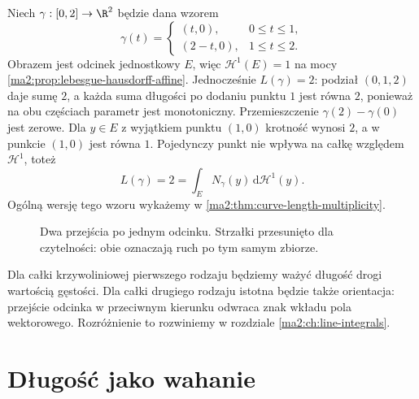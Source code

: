 \begin{przyklad}
\label{ma2:ex:curve-out-and-back}
Niech $\gamma:[0,2]\to\R^2$ będzie dana wzorem
\[
 \gamma(t)=
 \begin{cases}
 (t,0),&0\le t\le1,\\
 (2-t,0),&1\le t\le2.
 \end{cases}
\]
Obrazem jest odcinek jednostkowy $E$,
więc $\mathcal H^1(E)=1$ na mocy
\ref{ma2:prop:lebesgue-hausdorff-affine}.
Jednocześnie $L(\gamma)=2$:
podział $(0,1,2)$ daje sumę $2$,
a każda suma długości po dodaniu
punktu $1$ jest równa $2$, ponieważ
na obu częściach parametr jest monotoniczny.
Przemieszczenie $\gamma(2)-\gamma(0)$
jest zerowe. Dla $y\in E$ z wyjątkiem
punktu $(1,0)$ krotność wynosi $2$,
a w punkcie $(1,0)$ jest równa $1$.
Pojedynczy punkt nie wpływa na całkę
względem $\mathcal H^1$, toteż
\[
 L(\gamma)=2
 =\int_E N_\gamma(y)\,\mathrm d\mathcal H^1(y).
\]
Ogólną wersję tego wzoru wykażemy
w \ref{ma2:thm:curve-length-multiplicity}.
\end{przyklad}

\begin{figure}[htbp]
\centering
{}
\caption{Dwa przejścia po jednym odcinku.
Strzałki przesunięto dla czytelności:
obie oznaczają ruch po tym samym zbiorze.}
\label{ma2:fig:curve-out-and-back}
\end{figure}

Dla całki krzywoliniowej pierwszego
rodzaju będziemy ważyć długość drogi
wartością gęstości. Dla całki drugiego
rodzaju istotna będzie także orientacja:
przejście odcinka w przeciwnym kierunku
odwraca znak wkładu pola wektorowego.
Rozróżnienie to rozwiniemy w rozdziale
\ref{ma2:ch:line-integrals}.

\section{Długość jako wahanie}

